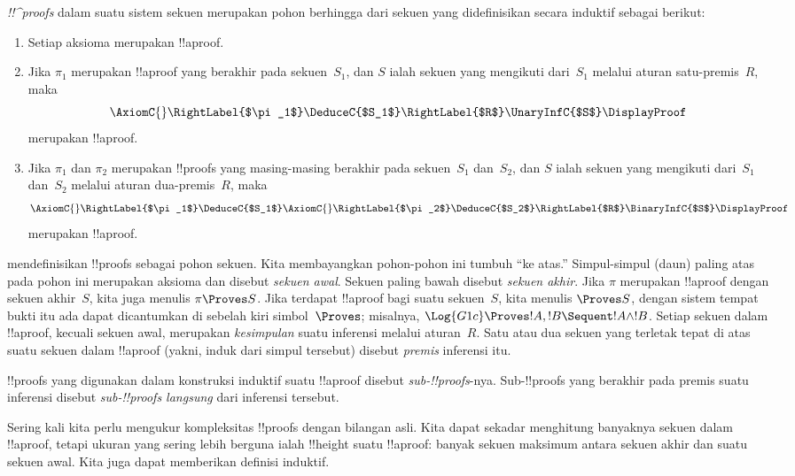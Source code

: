 \documentclass[../../../include/open-logic-section]{subfiles}
\begin{document}
\begin{defn}
\emph{!!^{proof}s} dalam suatu sistem sekuen merupakan pohon berhingga dari
sekuen yang didefinisikan secara induktif sebagai berikut:
\begin{enumerate}
  \item{} Setiap aksioma merupakan !!a{proof}.
  \item{} Jika $\pi_1$ merupakan !!a{proof} yang
  berakhir pada sekuen~$S_1$, dan $S$ ialah sekuen yang mengikuti dari~$S_1$
  melalui aturan satu-premis~$R$, maka
  \[
  \AxiomC{}
  \RightLabel{$\pi_1$}
  \DeduceC{$S_1$}
  \RightLabel{$R$}
  \UnaryInfC{$S$}
  \DisplayProof
  \]
  merupakan !!a{proof}.
  \item{} Jika $\pi_1$ dan $\pi_2$ merupakan
  !!{proof}s yang masing-masing berakhir pada sekuen~$S_1$ dan~$S_2$, dan $S$
  ialah sekuen yang mengikuti dari~$S_1$ dan~$S_2$ melalui aturan
  dua-premis~$R$, maka
  \[
  \AxiomC{}
  \RightLabel{$\pi_1$}
  \DeduceC{$S_1$}
  \AxiomC{}
  \RightLabel{$\pi_2$}
  \DeduceC{$S_2$}
  \RightLabel{$R$}
  \BinaryInfC{$S$}
  \DisplayProof
  \]
  merupakan !!a{proof}.
\end{enumerate}
\end{defn}

 mendefinisikan !!{proof}s sebagai pohon sekuen. Kita
membayangkan pohon-pohon ini tumbuh ``ke atas.'' Simpul-simpul (daun) paling
atas pada pohon ini merupakan aksioma dan disebut \emph{sekuen awal}. Sekuen
paling bawah disebut \emph{sekuen akhir}. Jika $\pi$ merupakan !!a{proof}
dengan sekuen akhir~$S$, kita juga menulis $\pi \Proves S$. Jika terdapat
!!a{proof} bagi suatu sekuen~$S$, kita menulis $\Proves S$, dengan sistem
tempat bukti itu ada dapat dicantumkan di sebelah kiri simbol~$\Proves$;
misalnya, $\Log{G1c} \Proves !A, !B \Sequent !A \land !B$. Setiap sekuen
dalam !!a{proof}, kecuali sekuen awal, merupakan \emph{kesimpulan} suatu
inferensi melalui aturan~$R$. Satu atau dua sekuen yang terletak tepat di
atas suatu sekuen dalam !!a{proof} (yakni, induk dari simpul tersebut)
disebut \emph{premis} inferensi itu.

!!{proof}s yang digunakan dalam konstruksi induktif suatu !!a{proof} disebut
\emph{sub-!!{proof}s}-nya. Sub-!!{proof}s yang berakhir pada premis suatu
inferensi disebut \emph{sub-!!{proof}s langsung} dari inferensi tersebut.

Sering kali kita perlu mengukur kompleksitas !!{proof}s dengan bilangan asli.
Kita dapat sekadar menghitung banyaknya sekuen dalam !!a{proof}, tetapi ukuran
yang sering lebih berguna ialah !!{height} suatu !!a{proof}: banyak sekuen
maksimum antara sekuen akhir dan suatu sekuen awal. Kita juga dapat memberikan
definisi induktif.
\end{document}
